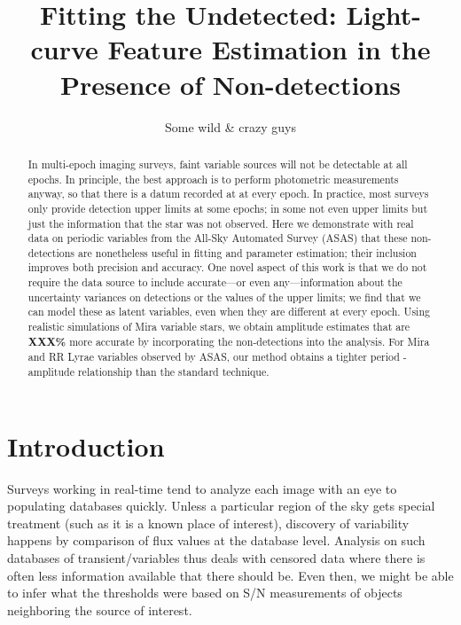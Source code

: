 \documentclass[12pt,preprint]{aastex}
\begin{document}

\shortauthors{}
\title{Fitting the Undetected:  Light-curve Feature Estimation in the Presence of Non-detections}
\author{
Some wild \& crazy guys
}
%



\begin{abstract}
In multi-epoch imaging surveys, faint variable sources will not be
detectable at all epochs.  In principle, the best approach is to
perform photometric measurements anyway, so that there is a datum
recorded at at every epoch.  In practice, most surveys only provide
detection upper limits at some epochs; in some not even upper
limits but just the information that the star was not observed.  Here
we demonstrate with real data on periodic variables from the All-Sky
Automated Survey (ASAS) that these non-detections are nonetheless useful in
fitting and parameter estimation; their inclusion improves both
precision and accuracy.  One novel aspect of this work is that we do
not require the data source to include accurate---or even
any---information about the uncertainty variances on detections or the
values of the upper limits; we find that we can model these as latent
variables, even when they are different at every epoch.  Using realistic
simulations of Mira variable stars, we obtain amplitude estimates that
are {\bf XXX\%} more accurate by incorporating the non-detections into
the analysis.  For  Mira and RR Lyrae variables observed by ASAS, our
method obtains a tighter period - amplitude relationship than the standard
technique.
\end{abstract}


\section{Introduction}
\label{sec:intro}



Surveys working in real-time tend to analyze each image with an eye to populating databases quickly. Unless a particular region of the sky gets special treatment (such as it is a known place of interest), discovery of variability happens by comparison of flux values at the database level. Analysis on such databases of transient/variables thus deals with censored data where there is often less information available that there should be. Even then, we might be able to infer what the thresholds were based on S/N measurements of objects neighboring the source of interest.
\end{document}
